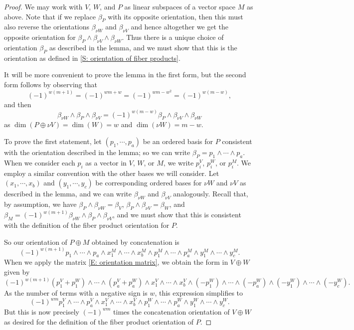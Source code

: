\begin{proof}
	We may work with $V$, $W$, and $P$ as linear subspaces of a vector space $M$ as above. Note that if we replace $\beta_P$ with its opposite orientation, then this must also reverse the orientations $\beta_{\nu W}$ and $\beta_{\nu V}$ and hence altogether we get the opposite orientation for $\beta_P \wedge \beta_{\nu V} \wedge \beta_{\nu W}$.
	Thus there is a unique choice of orientation $\beta_P$ as described in the lemma, and we must show that this is the orientation as defined in \cref{S: orientation of fiber products}.

	It will be more convenient to prove the lemma in the first form, but the second form follows by observing that $$(-1)^{w(m+1)} = (-1)^{wm+w} = (-1)^{wm-w^2} = (-1)^{w(m-w)},$$
	and then
	\[
	\beta_{\nu W} \wedge \beta_P \wedge \beta_{\nu V} =
	(-1)^{w(m-w)} \beta_P \wedge \beta_{\nu V} \wedge \beta_{\nu W}
	\]
	as $\dim(P \oplus \nu V) = \dim(W) = w$ and $\dim(\nu W) = m-w$.

	To prove the first statement, let $(p_1,\cdots,p_a)$ be an ordered basis for $P$ consistent with the orientation described in the lemma; so we can write $\beta_P = p_1 \wedge\cdots\wedge p_a$.
	When we consider each $p_i$ as a vector in $V$, $W$, or $M$, we write $p_i^V$, $p_i^W$, or $p_i^M$.
	We employ a similar convention with the other bases we will consider.
	Let $(x_1,\cdots,x_b)$ and $(y_1,\cdots,y_c)$ be corresponding ordered bases for $\nu W$ and $\nu V$ as described in the lemma, and we can write $\beta_{\nu W}$ and $\beta_{\nu V}$ analogously. Recall that, by assumption, we have $\beta_P \wedge \beta_{\nu W} = \beta_V$, $\beta_P \wedge \beta_{\nu V} = \beta_W$, and $\beta_M = (-1)^{w(m+1)} \beta_{\nu W} \wedge \beta_P \wedge \beta_{\nu V}$, and we must show that this is consistent with the definition of the fiber product orientation for $P$.

	So our orientation of $P \oplus M$ obtained by concatenation is
	$$(-1)^{w(m+1)} p_1 \wedge\cdots\wedge p_a \wedge x^M_1 \wedge\cdots\wedge x^M_b \wedge p^M_1 \wedge\cdots\wedge p^M_a \wedge y^M_1 \wedge\cdots\wedge y^M_c.$$
	When we apply the matrix \eqref{E: orientation matrix}, we obtain the form in $V \oplus W$ given by
	$$(-1)^{w(m+1)} (p^V_1+p^W_1) \wedge\cdots\wedge (p^V_a+p^W_a) \wedge x^V_1 \wedge\cdots\wedge x^V_b \wedge (- p^W_1) \wedge\cdots\wedge (-p^W_a) \wedge (-y^W_1) \wedge\cdots\wedge(- y^W_c).$$
	As the number of terms with a negative sign is $w$, this expression simplifies to
	$$(-1)^{wm} p^V_1 \wedge\cdots\wedge p^V_a \wedge x^V_1 \wedge\cdots\wedge x^V_b \wedge p^W_1 \wedge\cdots\wedge p^W_a \wedge y^W_1 \wedge\cdots\wedge y^W_c.$$
	But this is now precisely $(-1)^{wm}$ times the concatenation orientation of $V \oplus W$ as desired for the definition of the fiber product orientation of $P$.
\end{proof}

